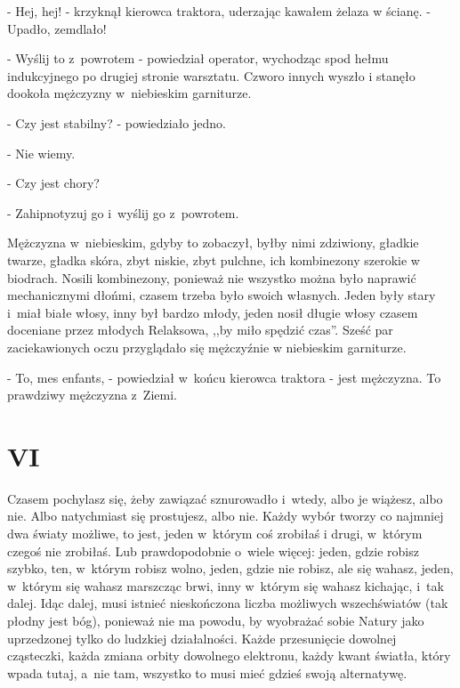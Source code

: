 \documentclass[oneside,polish,12pt,sfheadings]{mwbk}
\begin{document}
- Hej, hej! - krzyknął kierowca traktora, uderzając kawałem żelaza
w ścianę. - Upadło, zemdlało!

- Wyślij to z~powrotem - powiedział operator, wychodząc spod hełmu
indukcyjnego po drugiej stronie warsztatu. Czworo innych wyszło i
stanęło dookoła mężczyzny w~niebieskim garniturze.

- Czy jest stabilny? - powiedziało jedno.

- Nie wiemy.

- Czy jest chory?

- Zahipnotyzuj go i~wyślij go z~powrotem.

Mężczyzna w~niebieskim, gdyby to zobaczył, byłby nimi zdziwiony, gładkie
twarze, gładka skóra, zbyt niskie, zbyt pulchne, ich kombinezony szerokie
w biodrach. Nosili kombinezony, ponieważ nie wszystko można było naprawić
mechanicznymi dłońmi, czasem trzeba było swoich własnych. Jeden były
stary i~miał białe włosy, inny był bardzo młody, jeden nosił długie
włosy czasem doceniane przez młodych Relaksowa, ,,by miło spędzić
czas''. Sześć par zaciekawionych oczu przyglądało się mężczyźnie w
niebieskim garniturze.

- To, mes enfants, - powiedział w~końcu kierowca traktora - jest mężczyzna. To prawdziwy mężczyzna z~Ziemi.

\chapter{VI}

Czasem pochylasz się, żeby zawiązać sznurowadło i~wtedy, albo je wiążesz,
albo nie. Albo natychmiast się prostujesz, albo nie. Każdy wybór tworzy
co najmniej dwa światy możliwe, to jest, jeden w~którym coś zrobiłaś
i drugi, w~którym czegoś nie zrobiłaś. Lub prawdopodobnie o~wiele
więcej: jeden, gdzie robisz szybko, ten, w~którym robisz wolno, jeden,
gdzie nie robisz, ale się wahasz, jeden, w~którym się wahasz marszcząc
brwi, inny w~którym się wahasz kichając, i~tak dalej. Idąc dalej,
musi istnieć nieskończona liczba możliwych wszechświatów (tak płodny
jest bóg), ponieważ nie ma powodu, by wyobrażać sobie Natury jako
uprzedzonej tylko do ludzkiej działalności. Każde przesunięcie dowolnej
cząsteczki, każda zmiana orbity dowolnego elektronu, każdy kwant światła,
który wpada tutaj, a~nie tam, wszystko to musi mieć gdzieś swoją alternatywę.
\end{document}
